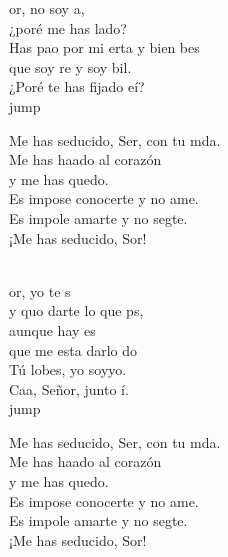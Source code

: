 \begin{cancion}%
	or, no soy a,  \\
	¿poré me has lado?\\
	Has pao por mi erta y bien bes\\
	que soy re y soy bil. \\
	¿Poré te has fijado eí? \\jump\\
	\begin{chorus}%
	Me has seducido, Ser, con tu mda.\\
	Me has haado al corazón \\
	y me has quedo.\\
	Es impose conocerte y no ame.\\
	Es impole amarte y no segte.\\
	¡Me has seducido, Sor!\\
	\end{chorus}%
	\jump\\
	or, yo te s \\
	y quo darte lo que ps,\\
	aunque hay es \\
	que me esta darlo do\\
	Tú lobes, yo soyyo.\\
	Caa, Señor, junto í. \\jump\\
	\begin{chorus}%
	Me has seducido, Ser, con tu mda.\\
	Me has haado al corazón \\
	y me has quedo.\\
	Es impose conocerte y no ame.\\
	Es impole amarte y no segte.\\
	¡Me has seducido, Sor!\\

\end{chorus}
\end{cancion}
